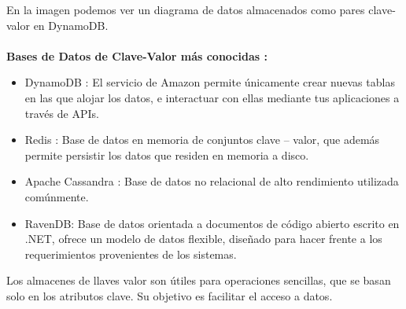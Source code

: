 \documentclass[%
 reprint,
 amsmath,amssymb,
 aps,
]{revtex4-1}
\begin{document}
En la imagen podemos ver un diagrama de datos almacenados como pares clave-valor en DynamoDB.\cite{imagen2}\\\\
\textbf{Bases de Datos de Clave-Valor más conocidas :}
\begin{itemize}
		\item DynamoDB : El servicio de Amazon permite únicamente crear nuevas tablas en las que alojar los datos, e interactuar con ellas mediante tus aplicaciones a través de APIs.
		\item Redis : Base de datos en memoria de conjuntos clave – valor, que además permite persistir los datos que residen en memoria a disco.
		\item Apache Cassandra : Base de datos no relacional de alto rendimiento utilizada comúnmente.
		\item RavenDB:  Base de datos orientada a documentos de código abierto escrito en .NET, ofrece un modelo de datos flexible, diseñado para hacer frente a los requerimientos provenientes de los sistemas.                     
\end{itemize}
Los almacenes de llaves valor son útiles para operaciones sencillas, que se basan solo en los atributos clave. Su objetivo es facilitar el acceso a datos.\\\\
\end{document}
